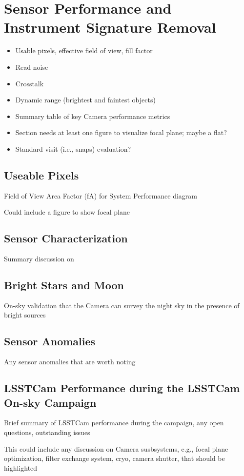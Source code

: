 \section{Sensor Performance and Instrument Signature Removal}
\label{sec:camera}

\begin{itemize}
    \item Usable pixels, effective field of view, fill factor
    \item Read noise
    \item Crosstalk
    \item Dynamic range (brightest and faintest objects)
    \item Summary table of key Camera performance metrics
    \item Section needs at least one figure to visualize focal plane; maybe a flat?
    \item Standard visit (i.e., snaps) evaluation?
\end{itemize}

\subsection{Useable Pixels}

Field of View Area Factor (fA) for System Performance diagram

Could include a figure to show focal plane

\subsection{Sensor Characterization}

Summary discussion on

\subsection{Bright Stars and Moon}

On-sky validation that the Camera can survey the night sky in the presence of bright sources

\subsection{Sensor Anomalies}

Any sensor anomalies that are worth noting

\subsection{LSSTCam Performance during the LSSTCam On-sky Campaign}

Brief summary of LSSTCam performance during the campaign, any open questions, outstanding issues

This could include any discussion on Camera susbsystems, e.g., focal plane optimization, filter exchange system, cryo, camera shutter, that should be highlighted